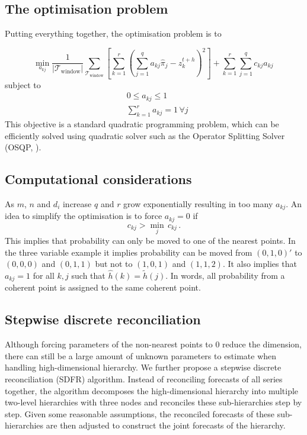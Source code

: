 \documentclass[a4paper,review,12pt,authoryear]{elsarticle}
\begin{document}
    \subsection{The optimisation problem}
    \label{sec:optimisation}
    
    Putting everything together, the optimisation problem is to 
    
    \[
    \underset{a_{kj}}{\min} \frac{1}{|\mathcal{T}_{\textrm{window}}|}\sum\limits_{\mathcal{T}_{\textrm{window}}}\left[\sum\limits_{k=1}^r\left(\sum\limits_{j=1}^q a_{kj}\hat{{\pi}}_j-z^{t+h}_k\right)^2\right] + \sum\limits_{k=1}^r\sum\limits_{j=1}^q c_{kj}a_{kj}\,
    \]
    subject to
    \begin{align*}
    &0\leq a_{kj}\leq 1\\
    &\sum\limits_{k=1}^r a_{kj} = 1 \,\forall j
    \end{align*}
    This objective is a standard quadratic programming problem, which can be efficiently solved using quadratic solver such as the Operator Splitting Solver (OSQP, \citealp{stellatoOSQPOperatorSplitting2020}).   

    
    \subsection{Computational considerations}
    
    As $m$, $n$ and $d_i$ increase $q$ and $r$ grow exponentially resulting in too many $a_{kj}$. An idea to simplify the optimisation is to force $a_{kj}=0$ if 
    \[
     c_{kj}>\underset{j}{\min}\,c_{kj}\,.
    \]  
    This implies that probability can only be moved to one of the nearest points. In the three variable example it implies probability can be moved from $(0,1,0)'$ to $(0,0,0)$ and $(0,1,1)$ but not to $(1,0,1)$ and $(1,1,2)$. It also implies that $a_{kj}=1$ for all $k,j$ such that $\hat{h}(k)=\tilde{h}(j)$. In words, all probability from a coherent point is assigned to the same coherent point.

   \subsection{Stepwise discrete reconciliation}

   Although forcing parameters of the non-nearest points to 0 reduce the dimension, there can still be a large amount of unknown parameters to estimate when handling high-dimensional hierarchy.
   We further propose a stepwise discrete reconciliation (SDFR) algorithm.
   Instead of reconciling forecasts of all series together,  the algorithm
   decomposes the high-dimensional hierarchy into multiple two-level hierarchies with three nodes and reconciles these sub-hierarchies step by step.
   Given some reasonable assumptions, the reconciled forecasts of these sub-hierarchies are then adjusted  to construct the joint forecasts of the hierarchy.
\end{document}
